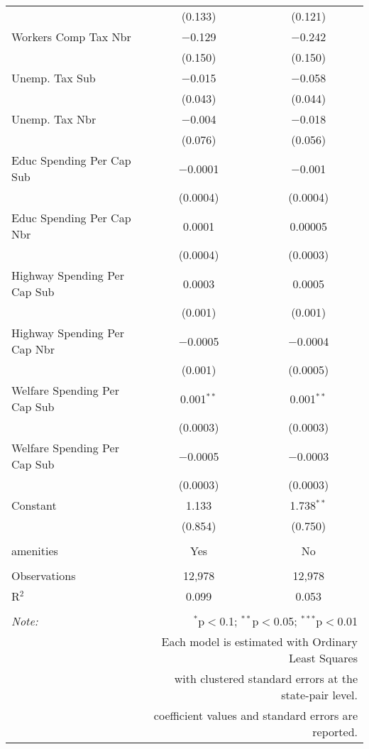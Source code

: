 \begin{table}[!htbp]
\begin{tabular}{@{\extracolsep{5pt}}lcc}
  & (0.133) & (0.121) \\ 
  Workers Comp Tax Nbr & $-$0.129 & $-$0.242 \\ 
  & (0.150) & (0.150) \\ 
  Unemp. Tax Sub & $-$0.015 & $-$0.058 \\ 
  & (0.043) & (0.044) \\ 
  Unemp. Tax Nbr & $-$0.004 & $-$0.018 \\ 
  & (0.076) & (0.056) \\ 
  Educ Spending Per Cap Sub & $-$0.0001 & $-$0.001 \\ 
  & (0.0004) & (0.0004) \\ 
  Educ Spending Per Cap Nbr & 0.0001 & 0.00005 \\ 
  & (0.0004) & (0.0003) \\ 
  Highway Spending Per Cap Sub & 0.0003 & 0.0005 \\ 
  & (0.001) & (0.001) \\ 
  Highway Spending Per Cap Nbr & $-$0.0005 & $-$0.0004 \\ 
  & (0.001) & (0.0005) \\ 
  Welfare Spending Per Cap Sub & 0.001$^{**}$ & 0.001$^{**}$ \\ 
  & (0.0003) & (0.0003) \\ 
  Welfare Spending Per Cap Sub & $-$0.0005 & $-$0.0003 \\ 
  & (0.0003) & (0.0003) \\ 
  Constant & 1.133 & 1.738$^{**}$ \\ 
  & (0.854) & (0.750) \\ 
 \hline \\[-1.8ex] 
amenities & Yes & No \\ 
\hline \\[-1.8ex] 
Observations & 12,978 & 12,978 \\ 
R$^{2}$ & 0.099 & 0.053 \\ 
\hline 
\hline \\[-1.8ex] 
\textit{Note:}  & \multicolumn{2}{r}{$^{*}$p$<$0.1; $^{**}$p$<$0.05; $^{***}$p$<$0.01} \\ 
 & \multicolumn{2}{r}{Each model is estimated with Ordinary Least Squares} \\ 
 & \multicolumn{2}{r}{with clustered standard errors at the state-pair level.} \\ 
 & \multicolumn{2}{r}{coefficient values and standard errors are reported.} \\ 
\end{tabular} 
\end{table} 
